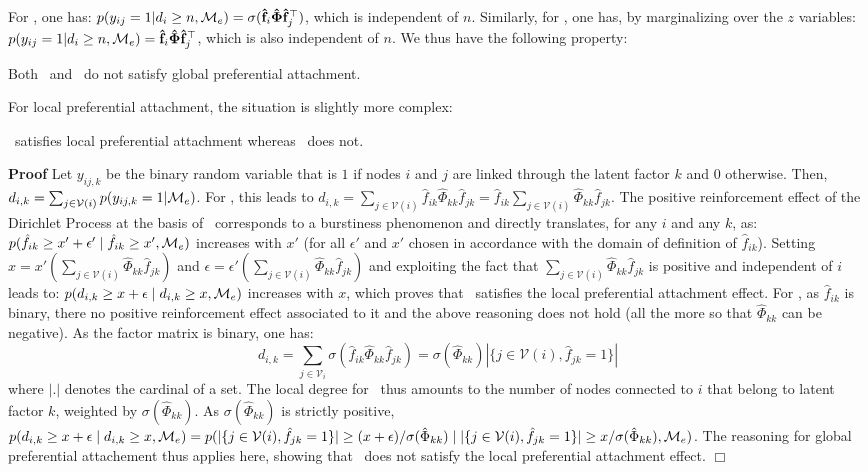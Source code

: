 For \ifm, one has: $p(y_{ij}=1 | d_i \ge n, \mathcal{M}_e) = \sigma(\mathbf{\hat{f}}_i \mathbf{\hat{\Phi}} \mathbf{\hat{f}}_j^\top)$, which is independent of $n$. Similarly, for \imb, one has, by marginalizing over the $z$ variables: $p(y_{ij}=1 | d_i \ge n, \mathcal{M}_e) = \mathbf{\hat{f}}_i \mathbf{\hat{\Phi}} \mathbf{\hat{f}}_j^\top$, which is also independent of $n$. We thus have the following property:
%
\begin{proposition}[]
\label{pref-attch-glob}
Both \ifm\ and \imb\ do not satisfy global preferential attachment.
\end{proposition}

For local preferential attachment, the situation is slightly more complex:
%
\begin{proposition}[]
\label{pref-attch-loc}
\imb\ satisfies local preferential attachment whereas \ifm\ does not.
\end{proposition}
%
\noindent \textbf{Proof} Let $y_{ij,k}$ be the binary random variable that is $1$ if nodes $i$ and $j$ are linked through the latent factor $k$ and $0$ otherwise. Then, $d_{i,k} = \sum_{j \in \mathcal{V}(i)} p(y_{ij,k} =1 | \mathcal{M}_e)$. For \imb, this leads to $d_{i,k} = \sum_{j \in \mathcal{V}(i)} \hat{f}_{ik} \hat{\Phi}_{kk} \hat{f}_{jk} = \hat{f}_{ik} \sum_{j \in \mathcal{V}(i)} \hat{\Phi}_{kk} \hat{f}_{jk}$. The positive reinforcement effect of the Dirichlet Process \cite{teh2006hierarchical} at the basis of \imb\ corresponds to a burstiness phenomenon and directly translates, for any $i$ and any $k$, as: $p(\hat{f}_{ik} \ge x'+\epsilon' \mid \hat{f}_{ik} \ge x',\mathcal{M}_e)$ increases with $x'$ (for all $\epsilon'$ and $x'$ chosen in accordance with the domain of definition of $\hat{f}_{ik}$). Setting $x=x'(\sum_{j \in \mathcal{V}(i)} \hat{\Phi}_{kk} \hat{f}_{jk})$ and $\epsilon = \epsilon'(\sum_{j \in \mathcal{V}(i)} \hat{\Phi}_{kk} \hat{f}_{jk})$ and exploiting the fact that $\sum_{j \in \mathcal{V}(i)} \hat{\Phi}_{kk} \hat{f}_{jk}$ is positive and independent of $i$ leads to: $p(d_{i,k} \ge x+\epsilon \mid d_{i,k} \ge x, \mathcal{M}_e)$ increases with $x$, which proves that \imb\ satisfies the local preferential attachment effect. For \ifm, as $\hat{f}_{ik}$ is binary, there no positive reinforcement effect associated to it and the above reasoning does not hold (all the more so that $\hat{\Phi}_{kk}$ can be negative). As the factor matrix is binary, one has:
%
\[ 
d_{i,k} = \sum_{j \in \mathcal{V}_i} \sigma(\hat{f}_{ik} \hat{\Phi}_{kk} \hat{f}_{jk}) =  \sigma(\hat{\Phi}_{kk}) |\{j \in \mathcal{V}(i), \hat{f}_{jk} =1\}|
\]
%
where $|.|$ denotes the cardinal of a set. The local degree for \ifm\ thus amounts to the number of nodes connected to $i$ that belong to latent factor $k$, weighted by $\sigma(\hat{\Phi}_{kk})$. As $\sigma(\hat{\Phi}_{kk})$ is strictly positive,  $p(d_{i,k} \ge x+\epsilon \mid d_{i,k} \ge x, \mathcal{M}_e) = p(|\{j \in \mathcal{V}(i), \hat{f}_{jk} =1\}| \ge (x+\epsilon)/ \sigma(\hat{\Phi}_{kk}) \mid |\{j \in \mathcal{V}(i), \hat{f}_{jk} =1\}| \ge x/\sigma(\hat{\Phi}_{kk}), \mathcal{M}_e)$. The reasoning for global preferential attachement thus applies here, showing that \ifm\ does not satisfy the local preferential attachment effect. \hspace{7.1cm} $\Box$

